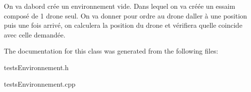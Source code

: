 On va d\textquotesingle{}abord crée un environnement vide. Dans lequel on va créée un essaim composé de 1 drone seul. On va donner pour ordre au drone d\textquotesingle{}aller à une position puis une fois arrivé, on calculera la position du drone et vérifiera qu\textquotesingle{}elle coincide avec celle demandée.

The documentation for this class was generated from the following files\+:\begin{DoxyCompactItemize}
\item 
tests\+Environnement.\+h\item 
tests\+Environnement.\+cpp\end{DoxyCompactItemize}
